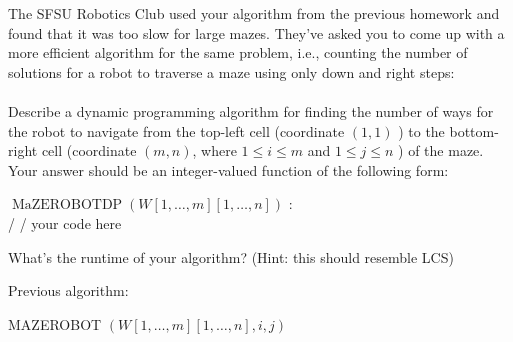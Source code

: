 \documentclass[11pt]{article}
\theoremstyle{definition}  %
\newcommand{\block}[2]{\begin{tcolorbox}[title={#1}]{#2}\end{tcolorbox}}
\begin{document}
\block{Question #3}{
The SFSU Robotics Club used your algorithm from the previous homework and found that it was too slow for large mazes. They've asked you to come up with a more efficient algorithm for the same problem, i.e., counting the number of solutions for a robot to traverse a maze using only down and right steps:\\\\
Describe a dynamic programming algorithm for finding the number of ways for the robot to navigate from the top-left cell (coordinate $(1,1)$ ) to the bottom-right cell (coordinate $(m, n)$, where $1 \leq i \leq m$ and $1 \leq j \leq n$ ) of the maze. Your answer should be an integer-valued function of the following form:
\begin{center}
  $\operatorname{MaZEROBOTDP}(W[1, \ldots, m][1, \ldots, n])$ :\\
  / / your code here
\end{center}
What's the runtime of your algorithm? (Hint: this should resemble LCS)
}

Previous algorithm: \\
\begin{algorithm}
    \caption{MAZEROBOT $(W[1, \ldots, m][1, \ldots, n], i, j)$  }
    \label{alg:algorithm_sum}
    \begin{algorithmic}[1]
      \EndIf
      \EndIf
      }%
      \State{return 1}
      \Else{

        \Return {MAZEROBOT(W,i-1,j)+MAZEROBOT(W,i,j-1)}
}
    \end{algorithmic}
  \end{algorithm}
  \pagebreak
\end{document}
